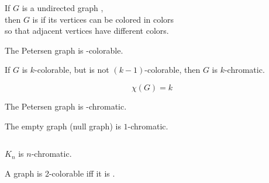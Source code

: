 
\begin{frame}{}
  \begin{definition}
    If $G$ is a  undirected graph , \\
    then $G$ is  if its vertices can be colored in  colors
    \\ so that adjacent vertices have different colors.
  \end{definition}

  \pause
  \begin{center}
    The Petersen graph is -colorable.
  \end{center}
\end{frame}

\begin{frame}{}
  \begin{definition}
    If $G$ is $k$-colorable, but is not $(k-1)$-colorable,
    then $G$ is $k$-chromatic.

    \[
      \chi(G) = k
    \]
  \end{definition}

  \pause
  \begin{center}
    The Petersen graph is -chromatic.
  \end{center}
\end{frame}

\begin{frame}{}
  \begin{lemma}
    The empty graph (null graph) is $1$-chromatic.
  \end{lemma}

  \pause
  \begin{columns}
  \end{columns}

  \pause
  \begin{lemma}
    $K_{n}$ is $n$-chromatic.
  \end{lemma}
\end{frame}

\begin{frame}{}
  \begin{theorem}
    A graph is 2-colorable iff \pause it is .
  \end{theorem}
\end{frame}

